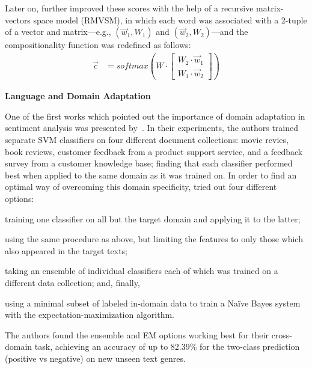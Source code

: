 Later on, \citet{Socher:12} further improved these scores with the
help of a recursive matrix-vectors space model (RMVSM), in which each
word was associated with a 2-tuple of a vector and matrix---e.g.,
$(\vec{w}_1, W_1)$ and $(\vec{w}_2, W_2)$---and the compositionality
function was redefined as follows:
\begin{align*}
  \vec{c} &= softmax\left(W\cdot\begin{bmatrix}
  W_2\cdot\vec{w}_1\\
  W_1\cdot\vec{w}_2
  \end{bmatrix}\right)
\end{align*}

\citet{Wang:15}

\textbf{Language and Domain Adaptation}

One of the first works which pointed out the importance of domain
adaptation in sentiment analysis was presented by~\citet{Aue:05}.  In
their experiments, the authors trained separate SVM classifiers on
four different document collections: movie revies, book reviews,
customer feedback from a product support service, and a feedback
survey from a customer knowledge base; finding that each classifier
performed best when applied to the same domain as it was trained on.
In order to find an optimal way of overcoming this domain specificity,
\citet{Aue:05} tried out four different options:
\begin{inparaenum}[(i)]
\item\label{sent-cgsa:lst:rel-wrk1} training one classifier on all but
  the target domain and applying it to the latter;
\item using the same procedure as above, but limiting the features to
  only those which also appeared in the target texts;
\item taking an ensemble of individual classifiers each of which was
  trained on a different data collection; and, finally,
\item using a minimal subset of labeled in-domain data to train a
  Na{\"i}ve Bayes system with the expectation-maximization
  \cite[EM;][]{Dempster:77} algorithm.
\end{inparaenum}
The authors found the ensemble and EM options working best for their
cross-domain task, achieving an accuracy of up to 82.39\% for the
two-class prediction (positive vs negative) on new unseen text genres.

